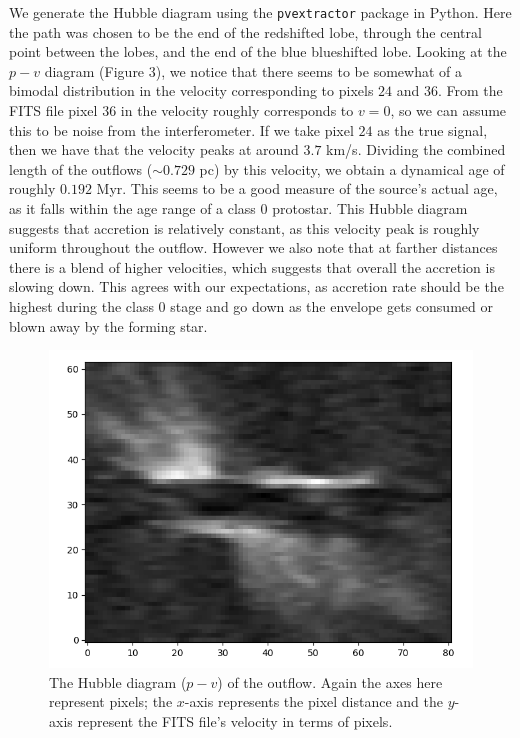\documentclass[11pt]{article}
\newenvironment{tight_enumerate}{
    \begin{enumerate}[label=(\alph*)]
    \setlength{\itemsep}{3pt}
    \setlength{\parskip}{0pt}}
    {\end{enumerate}}
\begin{document}
\begin{tight_enumerate}
\newpage
\item We generate the Hubble diagram using the \texttt{pvextractor} package in Python. Here the path was chosen to be the end of the redshifted lobe, through the central point between the lobes, and the end of the blue blueshifted lobe. Looking at the $p{-}v$ diagram (Figure 3), we notice that there seems to be somewhat of a bimodal distribution in the velocity corresponding to pixels $24$ and $36$. From the FITS file pixel $36$ in the velocity roughly corresponds to $v = 0$, so we can assume this to be noise from the interferometer. If we take pixel $24$ as the true signal, then we have that the velocity peaks at around $3.7$ \si{\kilo\meter/\second}. Dividing the combined length of the outflows (${\sim}0.729$ \si{pc}) by this velocity, we obtain a dynamical age of roughly $0.192$ \si{Myr}. This seems to be a good measure of the source's actual age, as it falls within the age range of a class 0 protostar. This Hubble diagram suggests that accretion is relatively constant, as this velocity peak is roughly uniform throughout the outflow. However we also note that at farther distances there is a blend of higher velocities, which suggests that overall the accretion is slowing down. This agrees with our expectations, as accretion rate should be the highest during the class 0 stage and go down as the envelope gets consumed or blown away by the forming star.

\begin{figure}[h]
\centering
\includegraphics[height=0.275\textheight]{hubble.png}
\vspace{-1em}
\caption{The Hubble diagram ($p{-}v$) of the outflow. Again the axes here represent pixels; the $x$-axis represents the pixel distance and the $y$-axis represent the FITS file's velocity in terms of pixels.}
\end{figure}


\end{tight_enumerate}
\end{document}

